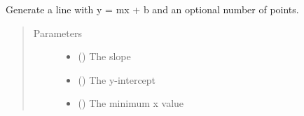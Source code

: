 \documentclass[letterpaper,10pt,english]{sphinxmanual}
\begin{document}

\begin{fulllineitems}
\label{\detokenize{pydv:pydvpy.line}}
Generate a line with y = mx + b and an optional number of points.

\begin{sphinxVerbatim}[commandchars=\\\{\}]
  
\end{sphinxVerbatim}

\begin{sphinxVerbatim}[commandchars=\\\{\}]
   
\end{sphinxVerbatim}

\begin{sphinxVerbatim}[commandchars=\\\{\}]
  
\end{sphinxVerbatim}
\begin{quote}\begin{description}
\item[{Parameters}] \leavevmode\begin{itemize}
\item {} 
 () \textendash{} The slope

\item {} 
 () \textendash{} The y-intercept

\item {} 
 () \textendash{} The minimum x value


\end{itemize}
\end{description}
\end{quote}
\end{fulllineitems}
\end{document}
